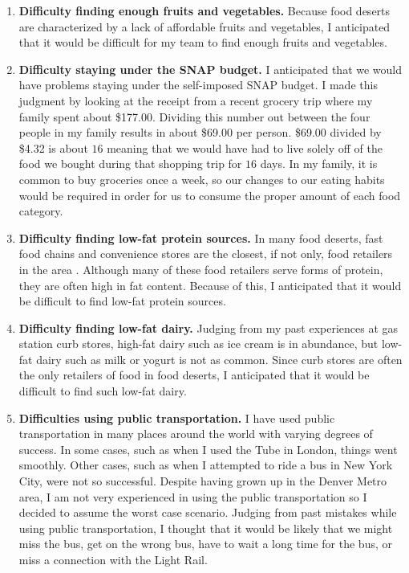 \documentclass[11pt]{article}
\begin{document}
\begin{enumerate}
    \item \textbf{Difficulty finding enough fruits and vegetables.} Because food deserts are
        characterized by a lack of affordable fruits and vegetables, I anticipated that it would be
        difficult for my team to find enough fruits and vegetables.

    \item \textbf{Difficulty staying under the SNAP budget.} I anticipated that we would have
        problems staying under the self-imposed SNAP budget. I made this judgment by looking at the
        receipt from a recent grocery trip where my family spent about \$177.00. Dividing this
        number out between the four people in my family results in about \$69.00 per person. \$69.00
        divided by \$4.32 is about $16$ meaning that we would have had to live solely off of the
        food we bought during that shopping trip for $16$ days. In my family, it is common to buy
        groceries once a week, so our changes to our eating habits would be required in order for us
        to consume the proper amount of each food category.

    \item \textbf{Difficulty finding low-fat protein sources.} In many food deserts, fast food
        chains and convenience stores are the closest, if not only, food retailers in the area
        \cite{gallagher}. Although many of these food retailers serve forms of protein, they are
        often high in fat content. Because of this, I anticipated that it would be difficult to find
        low-fat protein sources.

    \item \textbf{Difficulty finding low-fat dairy.} Judging from my past experiences at gas station
        curb stores, high-fat dairy such as ice cream is in abundance, but low-fat dairy such as
        milk or yogurt is not as common. Since curb stores are often the only retailers of food in
        food deserts, I anticipated that it would be difficult to find such low-fat dairy.

    \item \textbf{Difficulties using public transportation.} I have used public transportation in
        many places around the world with varying degrees of success. In some cases, such as when I
        used the Tube in London, things went smoothly. Other cases, such as when I attempted to ride
        a bus in New York City, were not so successful. Despite having grown up in the Denver Metro
        area, I am not very experienced in using the public transportation so I decided to assume
        the worst case scenario. Judging from past mistakes while using public transportation, I
        thought that it would be likely that we might miss the bus, get on the wrong bus, have to
        wait a long time for the bus, or miss a connection with the Light Rail.


\end{enumerate}
\end{document}
